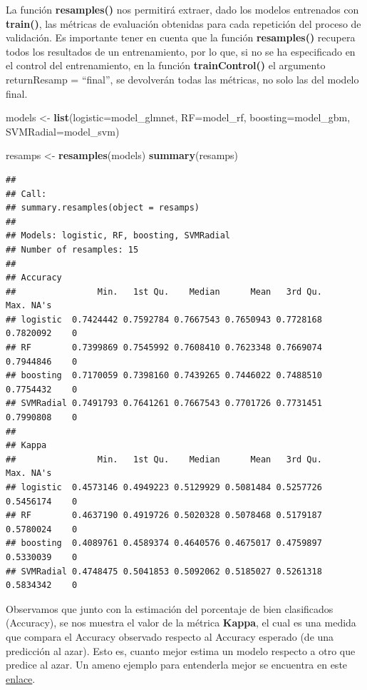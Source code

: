 \documentclass[]{article}
\newenvironment{Shaded}{\begin{snugshade}}{\end{snugshade}}
\newcommand{\DataTypeTok}[1]{\textcolor[rgb]{0.13,0.29,0.53}{#1}}
\newcommand{\KeywordTok}[1]{\textcolor[rgb]{0.13,0.29,0.53}{\textbf{#1}}}
\newcommand{\NormalTok}[1]{#1}
\newcommand{\StringTok}[1]{\textcolor[rgb]{0.31,0.60,0.02}{#1}}
\begin{document}
La función \textbf{resamples()} nos permitirá extraer, dado los modelos entrenados
con \textbf{train()}, las métricas de evaluación obtenidas para cada repetición del proceso de validación. Es importante tener en cuenta que la función \textbf{resamples()} recupera todos los resultados de un entrenamiento, por lo que, si no se ha especificado en el control del entrenamiento, en la función \textbf{trainControl()} el argumento returnResamp = ``final'', se devolverán todas las métricas, no solo las del modelo final.

\begin{Shaded}
\begin{Highlighting}[]
\NormalTok{models <-}\StringTok{ }\KeywordTok{list}\NormalTok{(}\DataTypeTok{logistic=}\NormalTok{model_glmnet,}
               \DataTypeTok{RF=}\NormalTok{model_rf, }
               \DataTypeTok{boosting=}\NormalTok{model_gbm, }
               \DataTypeTok{SVMRadial=}\NormalTok{model_svm)}

\NormalTok{resamps <-}\StringTok{ }\KeywordTok{resamples}\NormalTok{(models)}
\KeywordTok{summary}\NormalTok{(resamps)}
\end{Highlighting}
\end{Shaded}

\begin{verbatim}
## 
## Call:
## summary.resamples(object = resamps)
## 
## Models: logistic, RF, boosting, SVMRadial 
## Number of resamples: 15 
## 
## Accuracy 
##                Min.   1st Qu.    Median      Mean   3rd Qu.      Max. NA's
## logistic  0.7424442 0.7592784 0.7667543 0.7650943 0.7728168 0.7820092    0
## RF        0.7399869 0.7545992 0.7608410 0.7623348 0.7669074 0.7944846    0
## boosting  0.7170059 0.7398160 0.7439265 0.7446022 0.7488510 0.7754432    0
## SVMRadial 0.7491793 0.7641261 0.7667543 0.7701726 0.7731451 0.7990808    0
## 
## Kappa 
##                Min.   1st Qu.    Median      Mean   3rd Qu.      Max. NA's
## logistic  0.4573146 0.4949223 0.5129929 0.5081484 0.5257726 0.5456174    0
## RF        0.4637190 0.4919726 0.5020328 0.5078468 0.5179187 0.5780024    0
## boosting  0.4089761 0.4589374 0.4640576 0.4675017 0.4759897 0.5330039    0
## SVMRadial 0.4748475 0.5041853 0.5092062 0.5185027 0.5261318 0.5834342    0
\end{verbatim}

Observamos que junto con la estimación del porcentaje de bien
clasificados (Accuracy), se nos muestra el valor de la métrica
\textbf{Kappa}, el cual es una medida que compara el Accuracy
observado respecto al Accuracy esperado (de una predicción al
azar). Esto es, cuanto mejor estima un modelo respecto a otro que
predice al azar. Un ameno ejemplo para entenderla mejor se encuentra en
este
\href{https://stats.stackexchange.com/questions/82162/cohens-kappa-in-plain-english}{\color{blue}enlace}.
\end{document}
